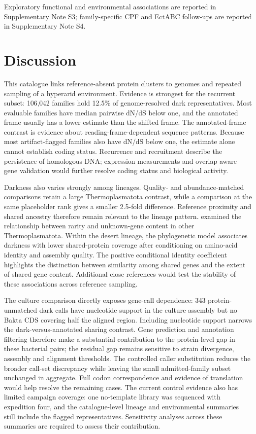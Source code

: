 \documentclass[11pt]{article}
\begin{document}
Exploratory functional and environmental associations are reported in Supplementary Note S3; family-specific CPF and EctABC follow-ups are reported in Supplementary Note S4.

\section*{Discussion}

This catalogue links reference-absent protein clusters to genomes and repeated sampling of a
hyperarid environment. Evidence is strongest for the recurrent subset: 106{,}042 families hold
12.5\% of genome-resolved dark representatives.
Most evaluable families have median pairwise dN/dS below one, and the annotated frame usually
has a lower estimate than the shifted frame. The annotated-frame contrast is evidence about reading-frame-dependent sequence patterns. Because most artifact-flagged families also have dN/dS below one, the estimate alone cannot establish coding status. Recurrence and recruitment describe the
persistence of homologous DNA; expression measurements and overlap-aware gene validation would further resolve coding status and biological activity.

Darkness also varies strongly among lineages. Quality- and abundance-matched comparisons
retain a large Thermoplasmatota contrast, while a comparison at the same placeholder rank gives
a smaller 2.5-fold difference. Reference proximity and shared ancestry therefore remain relevant
to the lineage pattern. \citet{maeke2025thermoplasmatota} examined the relationship between rarity
and unknown-gene content in other Thermoplasmatota. Within the desert lineage, the phylogenetic model associates darkness with lower shared-protein coverage after conditioning on amino-acid identity and assembly quality. The positive conditional identity coefficient highlights the distinction between similarity among shared genes and the extent of shared gene content. Additional close references would test the stability of these associations across reference sampling.

The culture comparison directly exposes gene-call dependence: 343 protein-unmatched dark calls have nucleotide support in the culture assembly but no Bakta CDS covering half the aligned region. Including nucleotide support narrows the dark-versus-annotated sharing contrast. Gene prediction and annotation filtering therefore make a substantial contribution to the protein-level gap in these bacterial pairs; the residual gap remains sensitive to strain divergence, assembly and alignment thresholds. The controlled caller substitution reduces the broader call-set discrepancy while leaving the small admitted-family subset unchanged in aggregate. Full codon correspondence and evidence of translation would help resolve the remaining cases. The current control evidence also has limited campaign
coverage: one no-template library was sequenced with expedition four, and the catalogue-level
lineage and environmental summaries still include the flagged representatives. Sensitivity
analyses across these summaries are required to assess their contribution.
\end{document}
